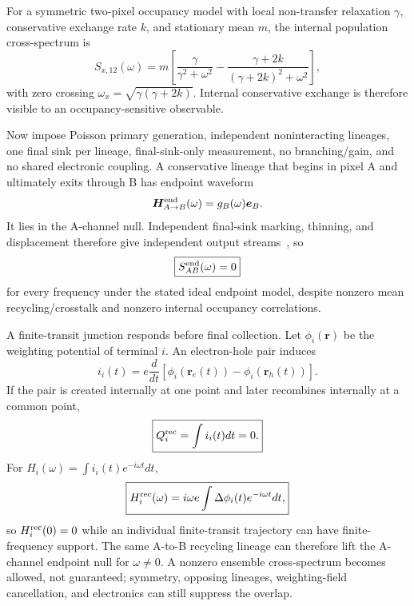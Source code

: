 \documentclass[aps,twocolumn,superscriptaddress,longbibliography]{revtex4-2}
\begin{document}
For a symmetric two-pixel occupancy model with local non-transfer relaxation $\gamma$, conservative exchange rate $k$, and stationary mean $m$, the internal population cross-spectrum is
\begin{equation}
\boxed{
S_{x,12}(\omega)=m\left[
\frac{\gamma}{\gamma^2+\omega^2}
-\frac{\gamma+2k}{(\gamma+2k)^2+\omega^2}
\right],}
\end{equation}
with zero crossing $\omega_x=\sqrt{\gamma(\gamma+2k)}$. Internal conservative exchange is therefore visible to an occupancy-sensitive observable.

Now impose Poisson primary generation, independent noninteracting lineages, one final sink per lineage, final-sink-only measurement, no branching/gain, and no shared electronic coupling. A conservative lineage that begins in pixel A and ultimately exits through B has endpoint waveform
\begin{equation}
\bm H_{A\to B}^{\rm end}(\omega)=g_B(\omega)\bm e_B.
\end{equation}
It lies in the A-channel null. Independent final-sink marking, thinning, and displacement therefore give independent output streams~\cite{Mirasol1963,Harrison1981}, so
\begin{equation}
\boxed{S_{AB}^{\rm end}(\omega)=0}
\label{eq:endpoint-zero}
\end{equation}
for every frequency under the stated ideal endpoint model, despite nonzero mean recycling/crosstalk and nonzero internal occupancy correlations.

A finite-transit junction responds before final collection. Let $\phi_i(\bm r)$ be the weighting potential of terminal $i$. An electron-hole pair induces
\begin{equation}
\boxed{
i_i(t)=e\frac{d}{dt}\left[\phi_i(\bm r_e(t))-\phi_i(\bm r_h(t))\right].}
\label{eq:ramo}
\end{equation}
If the pair is created internally at one point and later recombines internally at a common point,
\begin{equation}
\boxed{Q_i^{\rm rec}=\int i_i(t)dt=0.}
\label{eq:zerocharge}
\end{equation}
For $H_i(\omega)=\int i_i(t)e^{-i\omega t}dt$,
\begin{equation}
\boxed{
H_i^{\rm rec}(\omega)=i\omega e\int\Delta\phi_i(t)e^{-i\omega t}dt,}
\label{eq:ramo-fourier}
\end{equation}
so $H_i^{\rm rec}(0)=0$ while an individual finite-transit trajectory can have finite-frequency support. The same A-to-B recycling lineage can therefore lift the A-channel endpoint null for $\omega\neq0$. A nonzero ensemble cross-spectrum becomes allowed, not guaranteed; symmetry, opposing lineages, weighting-field cancellation, and electronics can still suppress the overlap.
\end{document}
